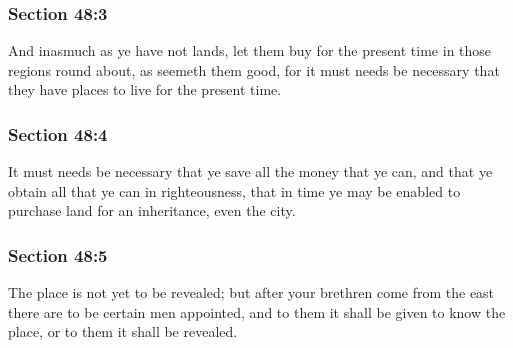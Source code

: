 	\subsubsection{Section 48:3} %
		\label{DC48-3}

		And inasmuch as ye have not lands, let them buy for the present time in those regions round about, as seemeth them good, for it must needs be necessary that they have places to live for the present time.


	\subsubsection{Section 48:4} %
		\label{DC48-4}

		It must needs be necessary that ye save all the money that ye can, and that ye obtain all that ye can in righteousness, that in time ye may be enabled to purchase land for an inheritance, even the city.


	\subsubsection{Section 48:5} %
		\label{DC48-5}

		The place is not yet to be revealed; but after your brethren come from the east there are to be certain men appointed, and to them it shall be given to know the place, or to them it shall be revealed.


